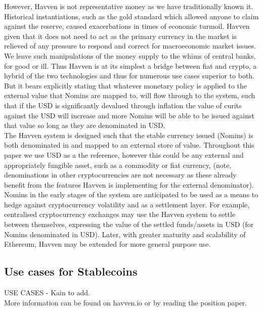 \noindent However, Havven is not representative money as we have traditionally known it. Historical instantiations, such as the gold standard which allowed anyone to claim against the reserve, caused exacerbations in times of economic turmoil. Havven given that it does not need to act as the primary currency in the market is relieved of any pressure to respond and correct for macroeconomic market issues. We leave such manipulations of the money supply to the whims of central banks, for good or ill. Thus Havven is at its simplest a bridge between fiat and crypto, a hybrid of the two technologies and thus for numerous use cases superior to both. But it bears explicitly stating that whatever monetary policy is applied to the external value that Nomins are mapped to, will flow through to the system, such that if the USD is significantly devalued through inflation the value of curits against the USD will increase and more Nomins will be able to be issued against that value so long as they are denominated in USD. \\

\noindent The Havven system is designed such that the stable currency issued (Nomins) is both denominated in and mapped to an external store of value. Throughout this paper we use USD as a the reference, however this could be any external and appropriately fungible asset, such as a commodity or fiat currency, (note, denominations in other cryptocurrencies are not necessary as these already benefit from the features Havven is implementing for the external denominator). \\

\noindent Nomins in the early stages of the system are anticipated to be used as a means to hedge against cryptocurrency volatility and as a settlement layer. For example, centralised cryptocurrency exchanges may use the Havven system to settle between themselves, expressing the value of the settled funds/assets in USD (for Nomins denominated in USD). Later, with greater maturity and scalability of Ethereum, Havven may be extended for more general purpose use. \\

\subsection{Use cases for Stablecoins}
\noindent USE CASES - Kain to add. \\

\noindent More information can be found on havven.io or by reading the position paper.

\pagebreak
